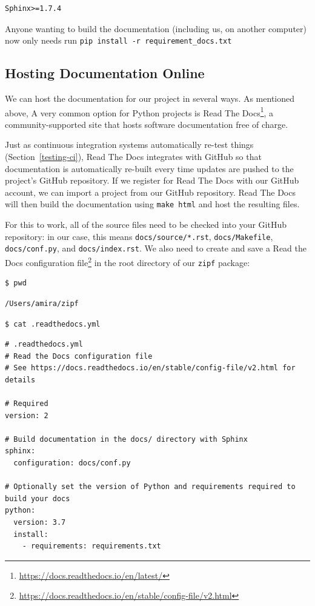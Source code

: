\documentclass[
]{krantz}
\renewcommand{\href}[2]{#2\footnote{\url{#1}}}
\begin{document}
\begin{verbatim}
Sphinx>=1.7.4
\end{verbatim}

Anyone wanting to build the documentation (including us, on another computer)
now only needs run \texttt{pip\ install\ -r\ requirement\_docs.txt}

\hypertarget{packaging-rtd}{%
\subsection{Hosting Documentation Online}\label{packaging-rtd}}

We can host the documentation for our project in several ways.
As mentioned above,
A very common option for Python projects is \href{https://docs.readthedocs.io/en/latest/}{Read The Docs},
a community-supported site that hosts software documentation free of charge.

Just as continuous integration systems automatically re-test things (Section~\ref{testing-ci}),
Read The Docs integrates with GitHub
so that documentation is automatically re-built
every time updates are pushed to the project's GitHub repository.
If we register for Read The Docs with our GitHub account,
we can import a project from our GitHub repository.
Read The Docs will then build the documentation using \texttt{make\ html}
and host the resulting files.

For this to work,
all of the source files
need to be checked into your GitHub repository:
in our case,
this means \texttt{docs/source/*.rst},
\texttt{docs/Makefile},
\texttt{docs/conf.py},
and \texttt{docs/index.rst}.
We also need to create and save a
\href{https://docs.readthedocs.io/en/stable/config-file/v2.html}{Read the Docs configuration file}
in the root directory of our \texttt{zipf} package:

\begin{verbatim}
$ pwd
\end{verbatim}

\begin{verbatim}
/Users/amira/zipf
\end{verbatim}

\begin{verbatim}
$ cat .readthedocs.yml
\end{verbatim}

\begin{verbatim}
# .readthedocs.yml
# Read the Docs configuration file
# See https://docs.readthedocs.io/en/stable/config-file/v2.html for details

# Required
version: 2

# Build documentation in the docs/ directory with Sphinx
sphinx:
  configuration: docs/conf.py

# Optionally set the version of Python and requirements required to build your docs
python:
  version: 3.7
  install:
    - requirements: requirements.txt
\end{verbatim}
\end{document}
